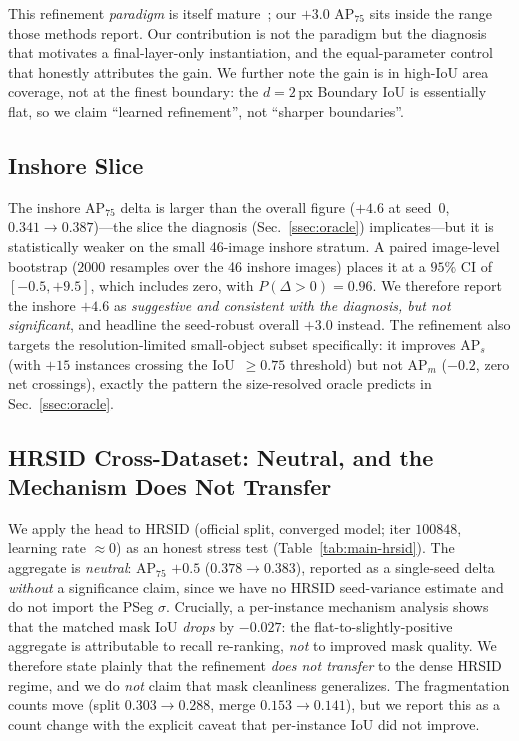 This refinement \emph{paradigm} is itself mature~\cite{kirillov2020pointrend,zhang2021refinemask,ke2022masktransfiner}; our $+3.0$ AP$_{75}$ sits inside the range those methods report. Our contribution is not the paradigm but the diagnosis that motivates a final-layer-only instantiation, and the equal-parameter control that honestly attributes the gain. We further note the gain is in high-IoU area coverage, not at the finest boundary: the $d=2$\,px Boundary IoU is essentially flat, so we claim ``learned refinement'', not ``sharper boundaries''.

\subsection{Inshore Slice}
\label{ssec:inshore}
The inshore AP$_{75}$ delta is larger than the overall figure ($+4.6$ at seed~0, $0.341\!\rightarrow\!0.387$)---the slice the diagnosis (Sec.~\ref{ssec:oracle}) implicates---but it is statistically weaker on the small 46-image inshore stratum. A paired image-level bootstrap ($2000$ resamples over the 46 inshore images) places it at a $95\%$ CI of $[-0.5,+9.5]$, which includes zero, with $P(\Delta\!>\!0)=0.96$. We therefore report the inshore $+4.6$ as \emph{suggestive and consistent with the diagnosis, but not significant}, and headline the seed-robust overall $+3.0$ instead. The refinement also targets the resolution-limited small-object subset specifically: it improves AP$_{s}$ (with $+15$ instances crossing the IoU~$\ge0.75$ threshold) but not AP$_{m}$ ($-0.2$, zero net crossings), exactly the pattern the size-resolved oracle predicts in Sec.~\ref{ssec:oracle}.

\subsection{HRSID Cross-Dataset: Neutral, and the Mechanism Does Not Transfer}
\label{ssec:hrsid}
We apply the head to HRSID (official split, converged model; iter $100848$, learning rate $\approx0$) as an honest stress test (Table~\ref{tab:main-hrsid}). The aggregate is \emph{neutral}: AP$_{75}$ $+0.5$ ($0.378\!\rightarrow\!0.383$), reported as a single-seed delta \emph{without} a significance claim, since we have no HRSID seed-variance estimate and do not import the PSeg $\sigma$. Crucially, a per-instance mechanism analysis shows that the matched mask IoU \emph{drops} by $-0.027$: the flat-to-slightly-positive aggregate is attributable to recall re-ranking, \emph{not} to improved mask quality. We therefore state plainly that the refinement \emph{does not transfer} to the dense HRSID regime, and we do \emph{not} claim that mask cleanliness generalizes. The fragmentation counts move (split $0.303\!\rightarrow\!0.288$, merge $0.153\!\rightarrow\!0.141$), but we report this as a count change with the explicit caveat that per-instance IoU did not improve.

